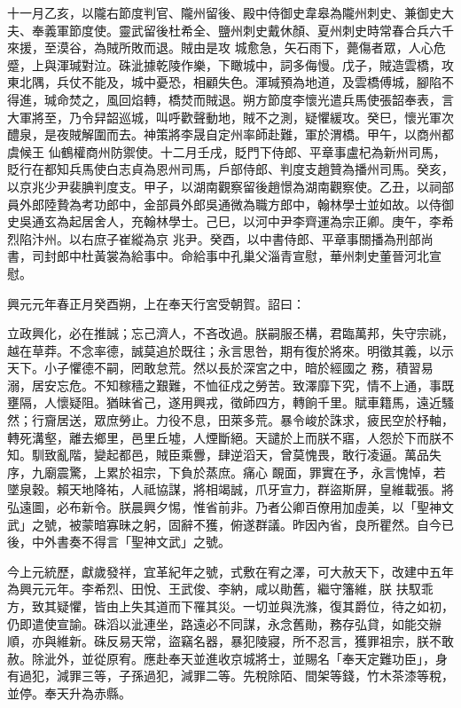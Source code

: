 \begin{pinyinscope}
 十一月乙亥，以隴右節度判官、隴州留後、殿中侍御史韋皋為隴州刺史、兼御史大夫、奉義軍節度使。靈武留後杜希全、鹽州刺史戴休顏、夏州刺史時常春合兵六千來援，至漠谷，為賊所敗而退。賊由是攻
 城愈急，矢石雨下，薨傷者眾，人心危蹙，上與渾瑊對泣。硃泚據乾陵作樂，下瞰城中，詞多侮慢。戊子，賊造雲橋，攻東北隅，兵仗不能及，城中憂恐，相顧失色。渾瑊預為地道，及雲橋傅城，腳陷不得進，瑊命焚之，風回焰轉，橋焚而賊退。朔方節度李懷光遣兵馬使張韶奉表，言大軍將至，乃令舁韶巡城，叫呼歡聲動地，賊不之測，疑懼緩攻。癸巳，懷光軍次醴泉，是夜賊解圍而去。神策將李晟自定州率師赴難，軍於渭橋。甲午，以商州都虞候王
 仙鶴權商州防禦使。十二月壬戌，貶門下侍郎、平章事盧杞為新州司馬，貶行在都知兵馬使白志貞為恩州司馬，戶部侍郎、判度支趙贊為播州司馬。癸亥，以京兆少尹裴腆判度支。甲子，以湖南觀察留後趙憬為湖南觀察使。乙丑，以祠部員外郎陸贄為考功郎中，金部員外郎吳通微為職方郎中，翰林學士並如故。以侍御史吳通玄為起居舍人，充翰林學士。己巳，以河中尹李齊運為宗正卿。庚午，李希烈陷汴州。以右庶子崔縱為京
 兆尹。癸酉，以中書侍郎、平章事關播為刑部尚書，司封郎中杜黃裳為給事中。命給事中孔巢父淄青宣慰，華州刺史董晉河北宣慰。



 興元元年春正月癸酉朔，上在奉天行宮受朝賀。詔曰：



 立政興化，必在推誠；忘己濟人，不吝改過。朕嗣服丕構，君臨萬邦，失守宗祧，越在草莽。不念率德，誠莫追於既往；永言思咎，期有復於將來。明徵其義，以示天下。小子懼德不嗣，罔敢怠荒。然以長於深宮之中，暗於經國之
 務，積習易溺，居安忘危。不知稼穡之艱難，不恤征戍之勞苦。致澤靡下究，情不上通，事既壅隔，人懷疑阻。猶昧省己，遂用興戎，徵師四方，轉餉千里。賦車籍馬，遠近騷然；行齎居送，眾庶勞止。力役不息，田萊多荒。暴令峻於誅求，疲民空於杼軸，轉死溝壑，離去鄉里，邑里丘墟，人煙斷絕。天譴於上而朕不寤，人怨於下而朕不知。馴致亂階，變起都邑，賊臣乘釁，肆逆滔天，曾莫愧畏，敢行凌逼。萬品失序，九廟震驚，上累於祖宗，下負於蒸庶。痛心
 靦面，罪實在予，永言愧悼，若墜泉穀。賴天地降祐，人祗協謀，將相竭誠，爪牙宣力，群盜斯屏，皇維載張。將弘遠圖，必布新令。朕晨興夕惕，惟省前非。乃者公卿百僚用加虛美，以「聖神文武」之號，被蒙暗寡昧之躬，固辭不獲，俯遂群議。昨因內省，良所瞿然。自今已後，中外書奏不得言「聖神文武」之號。



 今上元統歷，獻歲發祥，宜革紀年之號，式敷在宥之澤，可大赦天下，改建中五年為興元元年。李希烈、田悅、王武俊、李納，咸以勛舊，繼守籓維，朕
 扶馭乖方，致其疑懼，皆由上失其道而下罹其災。一切並與洗滌，復其爵位，待之如初，仍即遣使宣諭。硃滔以泚連坐，路遠必不同謀，永念舊勛，務存弘貸，如能交辦順，亦與維新。硃反易天常，盜竊名器，暴犯陵寢，所不忍言，獲罪祖宗，朕不敢赦。除泚外，並從原宥。應赴奉天並進收京城將士，並賜名「奉天定難功臣」，身有過犯，減罪三等，子孫過犯，減罪二等。先稅除陌、間架等錢，竹木茶漆等稅，並停。奉天升為赤縣。




\end{pinyinscope}
